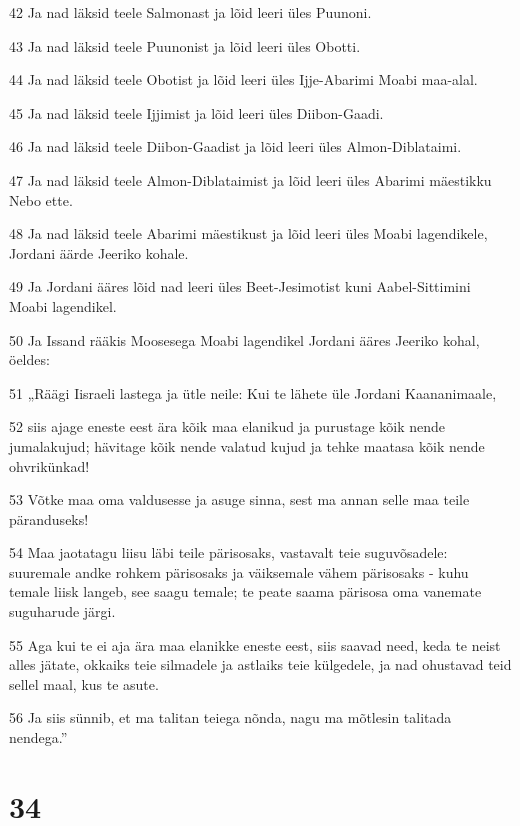 \par 42 Ja nad läksid teele Salmonast ja lõid leeri üles Puunoni.
\par 43 Ja nad läksid teele Puunonist ja lõid leeri üles Obotti.
\par 44 Ja nad läksid teele Obotist ja lõid leeri üles Ijje-Abarimi Moabi maa-alal.
\par 45 Ja nad läksid teele Ijjimist ja lõid leeri üles Diibon-Gaadi.
\par 46 Ja nad läksid teele Diibon-Gaadist ja lõid leeri üles Almon-Diblataimi.
\par 47 Ja nad läksid teele Almon-Diblataimist ja lõid leeri üles Abarimi mäestikku Nebo ette.
\par 48 Ja nad läksid teele Abarimi mäestikust ja lõid leeri üles Moabi lagendikele, Jordani äärde Jeeriko kohale.
\par 49 Ja Jordani ääres lõid nad leeri üles Beet-Jesimotist kuni Aabel-Sittimini Moabi lagendikel.
\par 50 Ja Issand rääkis Moosesega Moabi lagendikel Jordani ääres Jeeriko kohal, öeldes:
\par 51 „Räägi Iisraeli lastega ja ütle neile: Kui te lähete üle Jordani Kaananimaale,
\par 52 siis ajage eneste eest ära kõik maa elanikud ja purustage kõik nende jumalakujud; hävitage kõik nende valatud kujud ja tehke maatasa kõik nende ohvrikünkad!
\par 53 Võtke maa oma valdusesse ja asuge sinna, sest ma annan selle maa teile päranduseks!
\par 54 Maa jaotatagu liisu läbi teile pärisosaks, vastavalt teie suguvõsadele: suuremale andke rohkem pärisosaks ja väiksemale vähem pärisosaks - kuhu temale liisk langeb, see saagu temale; te peate saama pärisosa oma vanemate suguharude järgi.
\par 55 Aga kui te ei aja ära maa elanikke eneste eest, siis saavad need, keda te neist alles jätate, okkaiks teie silmadele ja astlaiks teie külgedele, ja nad ohustavad teid sellel maal, kus te asute.
\par 56 Ja siis sünnib, et ma talitan teiega nõnda, nagu ma mõtlesin talitada nendega.”

\chapter{34}

